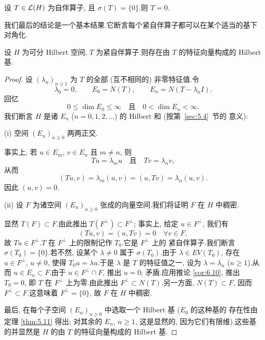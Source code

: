 \begin{corollary}
\label{cor:6.10}
设 $T\in\mathcal{L}(H)$ 为自伴算子, 且 $\sigma(T)=\{0\}$.则 $T=0$.
\end{corollary}

我们最后的结论是一个基本结果.它断言每个紧自伴算子都可以在某个适当的基下
对角化.

\begin{keytheorem}
\label{thm:6.11}
设 $H$ 为可分 Hilbert 空间, $T$ 为紧自伴算子.则存在由 $T$ 的特征向量构成的
Hilbert 基.
\end{keytheorem}

\begin{proof}
设 $(\lambda_n)_{n\ge1}$ 为 $T$ 的全部 (互不相同的) 非零特征值.令
\begin{equation*}
\lambda_0=0,\qquad E_0=N(T),\qquad E_n=N(T-\lambda_nI).
\end{equation*}
回忆
\begin{equation*}
0\le\dim E_0\le\infty\quad\text{且}\quad0<\dim E_n<\infty.
\end{equation*}
我们断言 $H$ 是诸 $E_n$ ($n=0,1,2,\dots$) 的 Hilbert 和 (按第~\ref{sec:5.4}~节的
意义):

(i) 空间 $(E_n)_{n\ge0}$ 两两正交.

事实上, 若 $u\in E_m$, $v\in E_n$ 且 $m\ne n$, 则
\begin{equation*}
Tu=\lambda_mu\quad\text{且}\quad Tv=\lambda_nv,
\end{equation*}
从而
\begin{equation*}
(Tu,v)=\lambda_m(u,v)=(u,Tv)=\lambda_n(u,v).
\end{equation*}
因此 $(u,v)=0$.

(ii) 设 $F$ 为诸空间 $(E_n)_{n\ge0}$ 张成的向量空间.我们将证明 $F$ 在 $H$
中稠密.

显然 $T(F)\subset F$.由此推出 $T(F^\perp)\subset F^\perp$; 事实上, 给定
$u\in F^\perp$, 我们有
\begin{equation*}
(Tu,v)=(u,Tv)=0\quad\forall v\in F,
\end{equation*}
故 $Tu\in F^\perp$.$T$ 在 $F^\perp$ 上的限制记作 $T_0$.它是 $F^\perp$ 上的
紧自伴算子.我们断言 $\sigma(T_0)=\{0\}$.若不然, 设某个 $\lambda\ne0$ 属于
$\sigma(T_0)$.由于 $\lambda\in EV(T_0)$, 存在 $u\in F^\perp$, $u\ne0$, 使得
$T_0u=\lambda u$.于是 $\lambda$ 是 $T$ 的特征值之一, 设为
$\lambda=\lambda_n$ ($n\ge1$).从而 $u\in E_n\subset F$.由于
$u\in F^\perp\cap F$, 推出 $u=0$; 矛盾.应用推论  \ref{cor:6.10}, 推出
$T_0=0$, 即 $T$ 在 $F^\perp$ 上为零.由此推出 $F^\perp\subset N(T)$.另一方面,
$N(T)\subset F$, 因而 $F^\perp\subset F$.这意味着 $F^\perp=\{0\}$, 故 $F$
在 $H$ 中稠密.

最后, 在每个子空间 $(E_n)_{n\ge0}$ 中选取一个 Hilbert 基 ($E_0$ 的这种基的
存在性由定理  \ref{thm:5.11} 得出; 对其余的 $E_n$, $n\ge1$, 这是显然的,
因为它们有限维).这些基的并显然是 $H$ 的由 $T$ 的特征向量构成的 Hilbert 基.
\end{proof}


